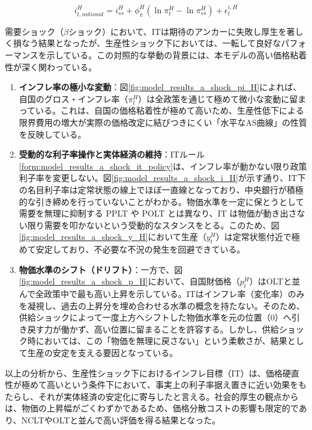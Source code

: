 \begin{equation}
i_{t,notional}^H=i_{ss}^H+\phi_\pi^H(\ln\pi_t^H-\ln\pi_{ss}^H)+\epsilon_t^{i,H}
\label{form:model_results_a_shock_it_policy}
\end{equation}

需要ショック（\(\beta\)ショック）において、ITは期待のアンカーに失敗し厚生を著しく損なう結果となったが、生産性ショック下においては、一転して良好なパフォーマンスを示している。この対照的な挙動の背景には、本モデルの高い価格粘着性が深く関わっている。

\begin{enumerate}
    \item\label{itm:model_results_a_shock_asad_analysis_it_pi} \textbf{インフレ率の極小な変動}：図\ref{fig:model_results_a_shock_pi_H}によれば、自国のグロス・インフレ率（\(\pi_t^H\)）は全政策を通じて極めて微小な変動に留まっている。これは、自国の価格粘着性が極めて高いため、生産性低下による限界費用の増大が実際の価格改定に結びつきにくい「水平なAS曲線」の性質を反映している。
    \item\label{itm:model_results_a_shock_asad_analysis_it_passive} \textbf{受動的な利子率操作と実体経済の維持}：ITルール\eqref{form:model_results_a_shock_it_policy}は、インフレ率が動かない限り政策利子率を変更しない。図\ref{fig:model_results_a_shock_i_H}が示す通り、IT下の名目利子率は定常状態の線上でほぼ一直線となっており、中央銀行が積極的な引き締めを行っていないことがわかる。物価水準を一定に保とうとして需要を無理に抑制する PPLT や POLT とは異なり、IT は物価が動き出さない限り需要を叩かないという受動的なスタンスをとる。このため、図\ref{fig:model_results_a_shock_y_H}において生産（\(y_t^H\)）は定常状態付近で極めて安定しており、不必要な不況の発生を回避できている。
    \item\label{itm:model_results_a_shock_asad_analysis_it_drift} \textbf{物価水準のシフト（ドリフト）}：一方で、図\ref{fig:model_results_a_shock_p_H}において、自国財価格（\(p_t^H\)）はOLTと並んで全政策中で最も高い上昇を示している。ITはインフレ率（変化率）のみを凝視し、過去の上昇分を埋め合わせる水準の概念を持たない。そのため、供給ショックによって一度上方へシフトした物価水準を元の位置（0）へ引き戻す力が働かず、高い位置に留まることを許容する。しかし、供給ショック時においては、この「物価を無理に戻さない」という柔軟さが、結果として生産の安定を支える要因となっている。
\end{enumerate}

以上の分析から、生産性ショック下におけるインフレ目標（IT）は、価格硬直性が極めて高いという条件下において、事実上の利子率据え置きに近い効果をもたらし、それが実体経済の安定化に寄与したと言える。社会的厚生の観点からは、物価の上昇幅がごくわずかであるため、価格分散コストの影響も限定的であり、NCLTやOLTと並んで高い評価を得る結果となった。

